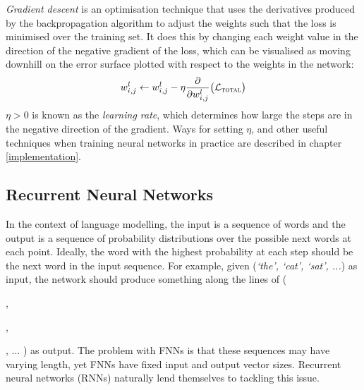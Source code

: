 \documentclass[a4paper, 12pt]{report}
\newcommand{\tit}[1]{\textit{#1}}
\begin{document}
\tit{Gradient descent} is an optimisation technique that uses the derivatives produced by the backpropagation algorithm to adjust the weights such that the loss is minimised over the training set. It does this by changing each weight value in the direction of the negative gradient of the loss, which can be visualised as moving downhill on the error surface plotted with respect to the weights in the network:
\begin{gather}
	w_{i,j}^l \leftarrow w_{i,j}^l - \eta \frac{\partial}{\partial w_{i,j}^l} \big( \mathcal{L}_{\text{\scshape total}} \big)
\end{gather}
$\eta > 0$ is known as the \tit{learning rate}, which determines how large the steps are in the negative direction of the gradient. Ways for setting $\eta$, and other useful techniques when training neural networks in practice are described in chapter \ref{implementation}.

\subsection{Recurrent Neural Networks} \label{rnns}

In the context of language modelling, the input is a sequence of words and the output is a sequence of probability distributions over the possible next words at each point. Ideally, the word with the highest probability at each step should be the next word in the input sequence. For example, given (\tit{`the', `cat', `sat', ...}) as input, the network should produce something along the lines of (~%
, %
, %
, %
... ) as output. The problem with FNNs is that these sequences may have varying length, yet FNNs have fixed input and output vector sizes. Recurrent neural networks (RNNs) naturally lend themselves to tackling this issue. \\
\end{document}
